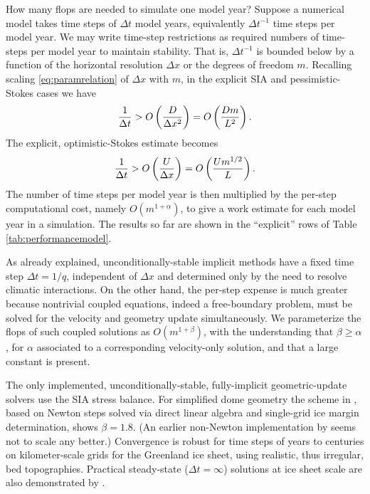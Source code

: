\documentclass[twocolumn,letterpaper]{igs}
\begin{document}
How many flops are needed to simulate one model year?  Suppose a numerical model takes time steps of $\Delta t$ model years, equivalently $\Delta t^{-1}$ time steps per model year.  We may write time-step restrictions as required numbers of time-steps per model year to maintain stability.  That is, $\Delta t^{-1}$ is bounded below by a function of the horizontal resolution $\Delta x$ or the degrees of freedom $m$.  Recalling scaling \eqref{eq:paramrelation} of $\Delta x$ with $m$, in the explicit SIA and pessimistic-Stokes cases we have
\begin{equation}
\frac{1}{\Delta t} > \displaystyle O\left(\frac{D}{\Delta x^2}\right) = \displaystyle O\left(\frac{D m}{L^2}\right). \label{eq:explicitsiarequired}
\end{equation}
The explicit, optimistic-Stokes estimate becomes
\begin{equation}
\frac{1}{\Delta t} > \displaystyle O\left(\frac{U}{\Delta x}\right) = \displaystyle O\left(\frac{U m^{1/2}}{L}\right). \label{eq:explicitoptstokesrequired}
\end{equation}
The number of time steps per model year is then multiplied by the per-step computational cost, namely $O(m^{1+\alpha})$, to give a work estimate for each model year in a simulation.  The results so far are shown in the ``explicit'' rows of Table \ref{tab:performancemodel}.

As already explained, unconditionally-stable implicit methods have a fixed time step $\Delta t = 1/q$, independent of $\Delta x$ and determined only by the need to resolve climatic interactions.  On the other hand, the per-step expense is much greater because nontrivial coupled equations, indeed a free-boundary problem, must be solved for the velocity and geometry update simultaneously.  We parameterize the flops of such coupled solutions as $O(m^{1+\beta})$, with the understanding that $\beta \ge \alpha$, for $\alpha$ associated to a corresponding velocity-only solution, and that a large constant is present.


The only implemented, unconditionally-stable, fully-implicit geometric-update solvers use the SIA stress balance.  For simplified dome geometry the scheme in \cite{Bueler2016}, based on Newton steps solved via direct linear algebra and single-grid ice margin determination, shows $\beta=1.8$.  (An earlier non-Newton implementation by \cite{JouvetBueler2012} seems not to scale any better.)  Convergence is robust for time steps of years to centuries on kilometer-scale grids for the Greenland ice sheet, using realistic, thus irregular, bed topographies.  Practical steady-state ($\Delta t=\infty$) solutions at ice sheet scale are also demonstrated by \cite{JouvetBueler2012,Bueler2016}.
\end{document}
